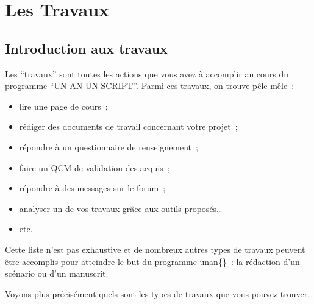 % 
% 
% 
% 
% 
% 
% 
% 

\chapter{Les Travaux}\hypertarget{les-travaux}{}\label{les-travaux}

\section{Introduction aux travaux}\hypertarget{introduction-aux-travaux}{}\label{introduction-aux-travaux}

Les “travaux” sont toutes les actions que vous avez à accomplir au cours du programme “UN AN UN SCRIPT”. Parmi ces travaux, on trouve pêle-mêle~{}:

\begin{itemize}
\item lire une page de cours~{};
\item rédiger des documents de travail concernant votre projet~{};
\item répondre à un questionnaire de renseignement~{};
\item faire un QCM de validation des acquis~{};
\item répondre à des messages sur le forum~{};
\item analyser un de vos travaux grâce aux outils proposés…
\item etc.
\end{itemize}

Cette liste n'est pas exhaustive et de nombreux autres types de travaux peuvent être accomplis pour atteindre le but du programme unan\{\}~{}: la rédaction d'un scénario ou d'un manuscrit.

Voyons plus précisément quels sont les types de travaux que vous pouvez trouver.

